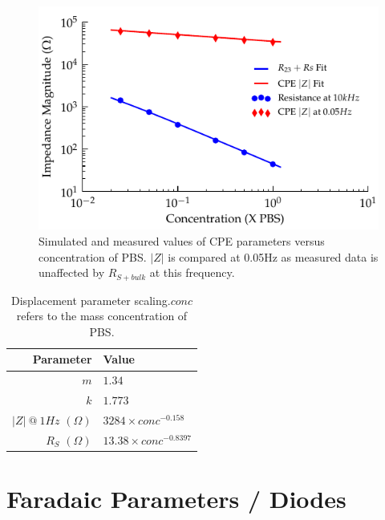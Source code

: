 \documentclass[journal, a4paper]{IEEEtran}
\begin{document}
\begin{figure}
    \begin{center}
        \includegraphics{graphics/scalingFactors_Displacement_IEEE}
    \end{center}
    \caption{Simulated and measured values of CPE parameters versus concentration of PBS. $|Z|$ is compared at 0.05\thinspace Hz as measured data is unaffected by $R_{S+bulk}$ at this frequency.}
    \label{fig:CPE_Scaling}
\end{figure}

\begin{table}
    \caption{Displacement parameter scaling.\hspace{\textwidth}$conc$ refers to the mass concentration of PBS.}
    \label{tab:CPEparams}
    \begin{center}
        \begin{tabular}{r | l}
            Parameter & Value \\
            \hline
            $m$ & $1.34$ \\
            $k$ & $1.773$\\
            $|Z|\: @\: 1Hz$ $(\Omega)$& $3284 \times conc^{-0.158}$ \\
            $R_{S}$ $(\Omega)$& $13.38 \times conc^{-0.8397} $\\
        \end{tabular}
    \end{center}
\end{table}



\section{Faradaic Parameters / Diodes}
\label{sect:faradaic}
\end{document}
